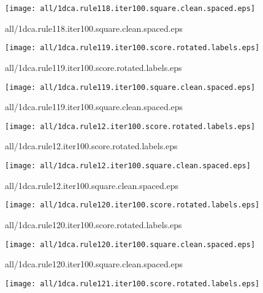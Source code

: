 \documentclass{article}
\begin{document}
\begin{center}
\begin{minipage}{\textwidth}
\texttt{[image: all/1dca.rule118.iter100.square.clean.spaced.eps]}
\end{minipage}
\end{center}
{\footnotesize all/1dca.rule118.iter100.square.clean.spaced.eps}
\begin{center}
\begin{minipage}{\textwidth}
\texttt{[image: all/1dca.rule119.iter100.score.rotated.labels.eps]}
\end{minipage}
\end{center}
{\footnotesize all/1dca.rule119.iter100.score.rotated.labels.eps}
\begin{center}
\begin{minipage}{\textwidth}
\texttt{[image: all/1dca.rule119.iter100.square.clean.spaced.eps]}
\end{minipage}
\end{center}
{\footnotesize all/1dca.rule119.iter100.square.clean.spaced.eps}
\begin{center}
\begin{minipage}{\textwidth}
\texttt{[image: all/1dca.rule12.iter100.score.rotated.labels.eps]}
\end{minipage}
\end{center}
{\footnotesize all/1dca.rule12.iter100.score.rotated.labels.eps}
\begin{center}
\begin{minipage}{\textwidth}
\texttt{[image: all/1dca.rule12.iter100.square.clean.spaced.eps]}
\end{minipage}
\end{center}
{\footnotesize all/1dca.rule12.iter100.square.clean.spaced.eps}
\begin{center}
\begin{minipage}{\textwidth}
\texttt{[image: all/1dca.rule120.iter100.score.rotated.labels.eps]}
\end{minipage}
\end{center}
{\footnotesize all/1dca.rule120.iter100.score.rotated.labels.eps}
\begin{center}
\begin{minipage}{\textwidth}
\texttt{[image: all/1dca.rule120.iter100.square.clean.spaced.eps]}
\end{minipage}
\end{center}
{\footnotesize all/1dca.rule120.iter100.square.clean.spaced.eps}
\begin{center}
\begin{minipage}{\textwidth}
\texttt{[image: all/1dca.rule121.iter100.score.rotated.labels.eps]}
\end{minipage}
\end{center}
\end{document}
